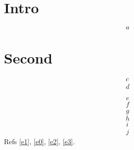 \documentclass{iopart}
\begin{document}
\section{Intro}
\begin{equation} a \end{equation}
\appendix
\section{Second}
\begin{numparts}
\begin{eqnarray} c \label{e1}\\ d \end{eqnarray}
\end{numparts}
\begin{equation} e \label{e0}\end{equation}
\numparts
\begin{eqnarray} f \\ g \end{eqnarray}
\endnumparts
\begin{equation} h \label{e2}\end{equation}
\numparts
\begin{eqnarray} i \label{e3}\\ j \end{eqnarray}
\endnumparts
Refs \ref{e1}, \ref{e0}, \ref{e2}, \ref{e3}.
\end{document}
